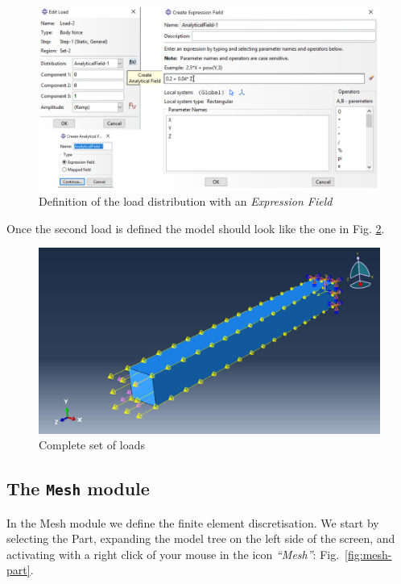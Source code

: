 \documentclass[spanish,a4paper,12pt]{article}
\begin{document}
\clearpage
\begin{figure}[h!tp]
\centering
\includegraphics[scale=0.85]{capturas/load7.png}
\caption{Definition of the load distribution with an \emph{Expression Field}}
\label{fig:load5}
\end{figure}

Once the second load is defined the model should look like the one in Fig. \ref{fig:load6}.

\begin{figure}[h!tp]
\centering
\includegraphics[scale=0.38]{capturas/load8.png}
\caption{Complete set of loads}
\label{fig:load6}
\end{figure}

\clearpage

\subsection{The \texttt{Mesh} module}

In the Mesh module we define the finite element discretisation. We start by selecting the Part, expanding the model tree on the left side of the screen, and activating with a right click of your mouse in the icon \emph{``Mesh''}:
Fig.~\ref{fig:mesh-part}.
\end{document}
